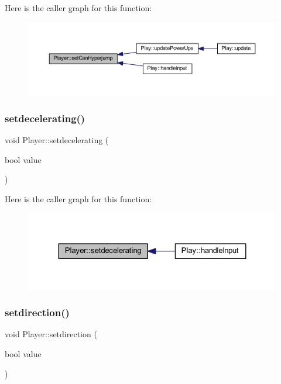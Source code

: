 Here is the caller graph for this function\+:
\nopagebreak
\begin{figure}[H]
\begin{center}
\leavevmode
\includegraphics[width=350pt]{class_player_ad3994801b0ca5d5da392302bbb56e0e8_icgraph}
\end{center}
\end{figure}
\mbox{\label{class_player_a1f28fd8b1c747434ba36b0127b61713b}} 
\subsubsection{\texorpdfstring{setdecelerating()}{setdecelerating()}}
{\footnotesize\ttfamily void Player\+::setdecelerating (\begin{DoxyParamCaption}\item[{bool}]{value }\end{DoxyParamCaption})}

Here is the caller graph for this function\+:
\nopagebreak
\begin{figure}[H]
\begin{center}
\leavevmode
\includegraphics[width=324pt]{class_player_a1f28fd8b1c747434ba36b0127b61713b_icgraph}
\end{center}
\end{figure}
\mbox{\label{class_player_a002f775383954913c852beedca3a2258}} 
\subsubsection{\texorpdfstring{setdirection()}{setdirection()}}
{\footnotesize\ttfamily void Player\+::setdirection (\begin{DoxyParamCaption}\item[{bool}]{value }\end{DoxyParamCaption})}

